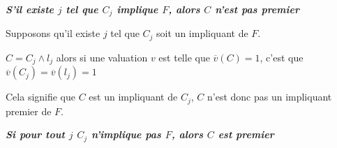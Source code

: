\documentclass[]{article}
\theoremstyle{remark}
\theoremstyle{definition}
\newenvironment{proofpart}[1]{
	\leavevmode
	
	\noindent
	{\textit{\textbf{\boldmath #1}}}
	
}{
	\checkmark
}
\begin{document}
\begin{proofpart}{S'il existe $j$ tel que $C_j$ implique $F$, alors $C$ n'est pas premier}
	Supposons qu'il existe $j$ tel que $C_j$ soit un impliquant de $F$.
	
	$C = C_j \land l_j$ alors si une valuation $v$ est telle que $\overline{v}(C) = 1$, c'est que $\overline{v}(C_j)=\overline{v}(l_j)=1$
	
	Cela signifie que $C$ est un impliquant de $C_j$, $C$ n'est donc pas un impliquant premier de $F$.
\end{proofpart}

\begin{proofpart}{Si pour tout $j$ $C_j$ n'implique pas $F$, alors $C$ est premier}
	
\end{proofpart}
\end{document}
